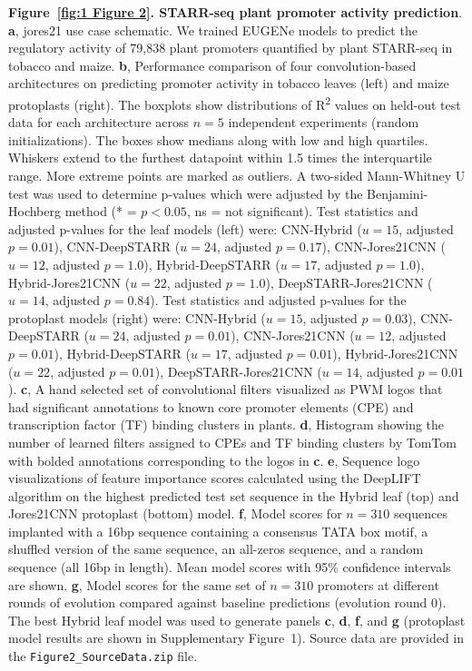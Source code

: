 \thispagestyle{plain}
\noindent 
\textbf{Figure~\ref{fig:1 Figure 2}. STARR-seq plant promoter activity prediction}. \textbf{a}, jores21 use case schematic. We trained EUGENe models to predict the regulatory activity of 79,838 plant promoters quantified by plant STARR-seq in tobacco and maize. \textbf{b}, Performance comparison of four convolution-based architectures on predicting promoter activity in tobacco leaves (left) and maize protoplasts (right). The boxplots show distributions of R\textsuperscript{2} values on held-out test data for each architecture across \(n = 5\) independent experiments (random initializations). The boxes show medians along with low and high quartiles. Whiskers extend to the furthest datapoint within 1.5 times the interquartile range. More extreme points are marked as outliers. A two-sided Mann-Whitney U test was used to determine p-values which were adjusted by the Benjamini-Hochberg method (* = \(p < 0.05\), ns = not significant). Test statistics and adjusted p-values for the leaf models (left) were: CNN-Hybrid (\(u=15\), adjusted \(p=0.01\)), CNN-DeepSTARR (\(u=24\), adjusted \(p=0.17\)), CNN-Jores21CNN (\(u=12\), adjusted \(p=1.0\)), Hybrid-DeepSTARR (\(u=17\), adjusted \(p=1.0\)), Hybrid-Jores21CNN (\(u=22\), adjusted \(p=1.0\)), DeepSTARR-Jores21CNN (\(u=14\), adjusted \(p=0.84\)). Test statistics and adjusted p-values for the protoplast models (right) were: CNN-Hybrid (\(u=15\), adjusted \(p=0.03\)), CNN-DeepSTARR (\(u=24\), adjusted \(p=0.01\)), CNN-Jores21CNN (\(u=12\), adjusted \(p=0.01\)), Hybrid-DeepSTARR (\(u=17\), adjusted \(p=0.01\)), Hybrid-Jores21CNN (\(u=22\), adjusted \(p=0.01\)), DeepSTARR-Jores21CNN (\(u=14\), adjusted \(p=0.01\)). \textbf{c}, A hand selected set of convolutional filters visualized as PWM logos that had significant annotations to known core promoter elements (CPE) and transcription factor (TF) binding clusters in plants. \textbf{d}, Histogram showing the number of learned filters assigned to CPEs and TF binding clusters by TomTom with bolded annotations corresponding to the logos in \textbf{c}. \textbf{e}, Sequence logo visualizations of feature importance scores calculated using the DeepLIFT algorithm on the highest predicted test set sequence in the Hybrid leaf (top) and Jores21CNN protoplast (bottom) model. \textbf{f}, Model scores for \(n=310\) sequences implanted with a 16bp sequence containing a consensus TATA box motif, a shuffled version of the same sequence, an all-zeros sequence, and a random sequence (all 16bp in length). Mean model scores with 95\% confidence intervals are shown. \textbf{g}, Model scores for the same set of \(n=310\) promoters at different rounds of evolution compared against baseline predictions (evolution round 0). The best Hybrid leaf model was used to generate panels \textbf{c}, \textbf{d}, \textbf{f}, and \textbf{g} (protoplast model results are shown in Supplementary Figure~1). Source data are provided in the \texttt{Figure2\_SourceData.zip} file.

